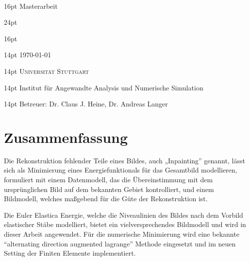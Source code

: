 
\begin{titlepage}
  \begin{center}
    ~\par\vspace{4em}
    {
      \fontsize { 16pt } { 16pt } \selectfont
      Masterarbeit
    }
    \par\vspace{3em}
    {
      \fontsize { 24pt } { 24pt } \selectfont \sffamily \bfseries
      \thetitle
    }
    \par\vspace{3em}
    {
      \fontsize { 16pt } { 16pt } \selectfont \scshape
      \theauthor
    }
    \par\vspace{1.5em}
    {
      \fontsize { 14pt } { 14pt } \selectfont %
      \today
    }
    \par\vspace{4.5em}
    {
    }
    \par\vspace{8em}
    {
      \fontsize { 14pt } { 14pt } \selectfont \scshape
      Universität Stuttgart
    }
    \par\vspace{1em}
    {
      \fontsize { 14pt } { 14pt } \selectfont %
      Institut für Angewandte Analysis und Numerische Simulation
    }
    \par\vspace{1em}
    {
      \fontsize { 14pt } { 14pt } \selectfont %
      Betreuer:
      Dr. Claus J. Heine,
      Dr. Andreas Langer
    }
  \end{center}
\end{titlepage}

\chapter*{Zusammenfassung}

Die Rekonstruktion fehlender Teile eines Bildes, auch „Inpainting” genannt, lässt sich als Minimierung eines
Energiefunktionals für das Gesamtbild modellieren, formuliert mit einem Datenmodell, das die Übereinstimmung mit dem ursprünglichen Bild auf dem bekannten Gebiet kontrolliert, und einem Bildmodell, welches maßgebend für die Güte der Rekonstruktion ist.

Die Euler Elastica Energie, welche die Niveaulinien des Bildes nach dem Vorbild elastischer Stäbe modelliert, bietet ein vielversprechendes Bildmodell und wird in dieser Arbeit angewendet.
Für die numerische Minimierung wird eine bekannte “alternating direction augmented lagrange” Methode eingesetzt und im neuen Setting der Finiten Elemente implementiert.


{
  \let\clearpage\relax
  \tableofcontents
}

